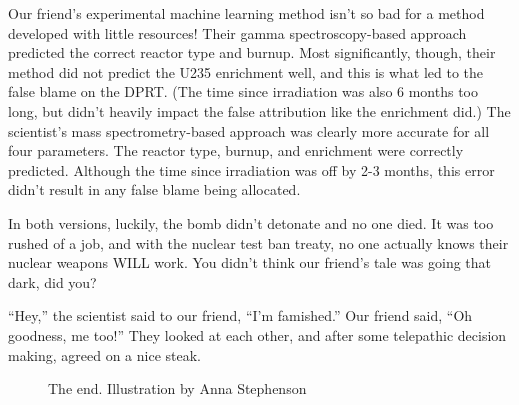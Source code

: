 {Our friend's experimental machine learning method isn't so bad for a method
developed with little resources!  Their gamma spectroscopy-based approach
predicted the correct reactor type and burnup.  Most significantly, though,
their method did not predict the \gls{U235} enrichment well, and this is what
led to the false blame on the DPRT.  (The time since irradiation was also 6
months too long, but didn't heavily impact the false attribution like the
enrichment did.) The scientist's mass spectrometry-based approach was clearly
more accurate for all four parameters. The reactor type, burnup, and enrichment
were correctly predicted. Although the time since irradiation was off by 2-3
months, this error didn't result in any false blame being allocated.

In both versions, luckily, the bomb didn't detonate and no one died. It was too
rushed of a job, and with the nuclear test ban treaty, no one actually knows
their nuclear weapons WILL work. You didn't think our friend's tale was going
that dark, did you?

\vspace{8mm}
\begin{shadequote}

  ``Hey,'' the scientist said to our friend, ``I'm famished.'' Our friend said, ``Oh
  goodness, me too!'' They looked at each other, and after some telepathic
  decision making, agreed on a nice steak.

\end{shadequote}

\begin{figure}[H]
  \centering
  \large The end. \small Illustration by Anna Stephenson \\~\\
\end{figure}

}
